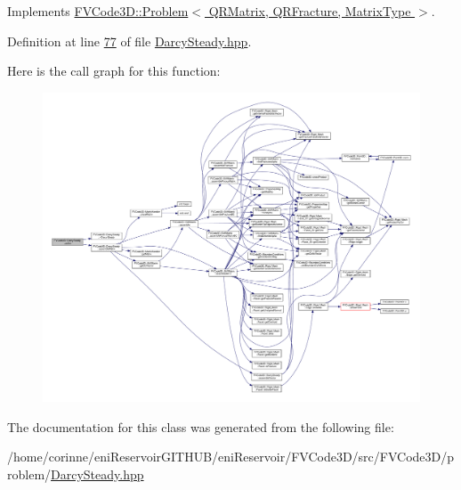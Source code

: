 Implements \hyperlink{classFVCode3D_1_1Problem_a7ee30db5a251dc7a9778c821e49cf376}{F\+V\+Code3\+D\+::\+Problem$<$ Q\+R\+Matrix, Q\+R\+Fracture, Matrix\+Type $>$}.



Definition at line \hyperlink{DarcySteady_8hpp_source_l00077}{77} of file \hyperlink{DarcySteady_8hpp_source}{Darcy\+Steady.\+hpp}.



Here is the call graph for this function\+:
\nopagebreak
\begin{figure}[H]
\begin{center}
\leavevmode
\includegraphics[width=350pt]{classFVCode3D_1_1DarcySteady_aaa82aad9d7006a5c1e96e103f602082b_cgraph}
\end{center}
\end{figure}




The documentation for this class was generated from the following file\+:\begin{DoxyCompactItemize}
\item 
/home/corinne/eni\+Reservoir\+G\+I\+T\+H\+U\+B/eni\+Reservoir/\+F\+V\+Code3\+D/src/\+F\+V\+Code3\+D/problem/\hyperlink{DarcySteady_8hpp}{Darcy\+Steady.\+hpp}\end{DoxyCompactItemize}
